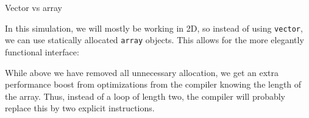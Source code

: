  {Vector vs array}


In this simulation, we will mostly be working in 2D,
so instead of using \lstinline{vector},
we can use statically allocated \lstinline{array} objects.
This allows for the more elegantly functional interface:
%

While above we have removed all unnecessary allocation,
we get an extra performance boost from optimizations
from the compiler knowing the length of the array.
Thus, instead of a loop of length two,
the compiler will probably replace this by
two explicit instructions.


